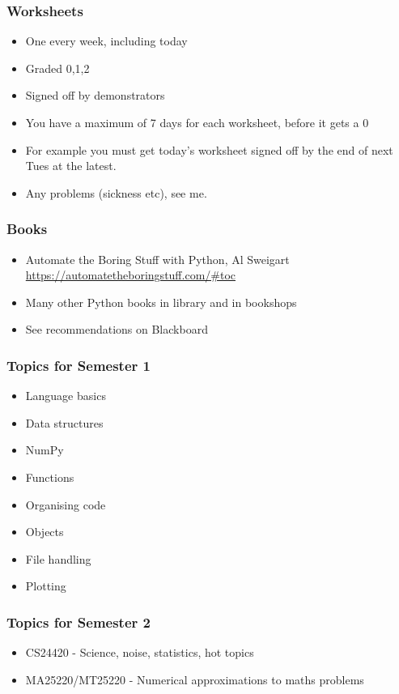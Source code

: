 \documentclass{beamer}
\begin{document}
\begin{frame}
\frametitle{Worksheets}
\begin{itemize}
\item One every week, including today
\item Graded 0,1,2
\item Signed off by demonstrators
\item You have a maximum of 7 days for each worksheet, before it gets a 0
\item For example you must get today's worksheet signed off by the end
  of next Tues at the latest.
\item Any problems (sickness etc), see me.
\end{itemize}
\end{frame}


\begin{frame}
\frametitle{Books}
\begin{itemize}
\item Automate the Boring Stuff with Python, Al Sweigart 
    \url{https://automatetheboringstuff.com/\#toc}
\item Many other Python books in library and in bookshops
\item See recommendations on Blackboard
\end{itemize}
\end{frame}



\begin{frame}
\frametitle{Topics for Semester 1}
\begin{itemize}
\item Language basics
\item Data structures
\item NumPy
\item Functions
\item Organising code
\item Objects
\item File handling
\item Plotting
\end{itemize}
\end{frame}

\begin{frame}
\frametitle{Topics for Semester 2}
\begin{itemize}
\item CS24420 - Science, noise, statistics, hot topics
\item MA25220/MT25220 - Numerical approximations to maths problems
\end{itemize}
\end{frame}
\end{document}
